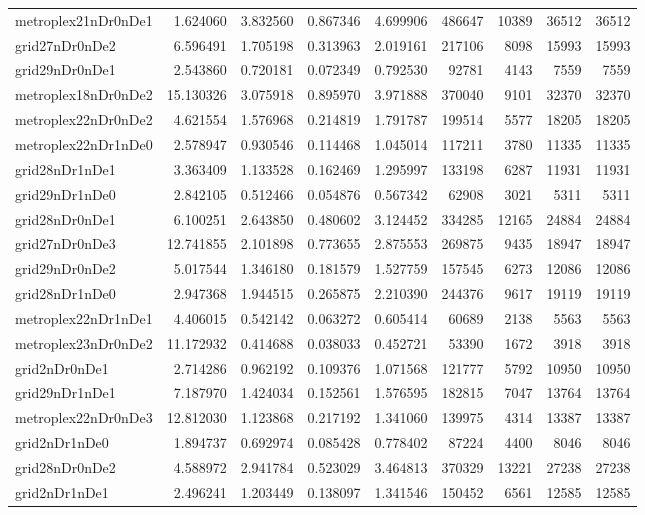 \begin{longtable}{|l|r|r|r|r|r|r|r|r|}
metroplex21nDr0nDe1 & 1.624060 & 3.832560 & 0.867346 & 4.699906 & 486647 & 10389 & 36512 & 36512 \\
grid27nDr0nDe2 & 6.596491 & 1.705198 & 0.313963 & 2.019161 & 217106 & 8098 & 15993 & 15993 \\
grid29nDr0nDe1 & 2.543860 & 0.720181 & 0.072349 & 0.792530 & 92781 & 4143 & 7559 & 7559 \\
metroplex18nDr0nDe2 & 15.130326 & 3.075918 & 0.895970 & 3.971888 & 370040 & 9101 & 32370 & 32370 \\
metroplex22nDr0nDe2 & 4.621554 & 1.576968 & 0.214819 & 1.791787 & 199514 & 5577 & 18205 & 18205 \\
metroplex22nDr1nDe0 & 2.578947 & 0.930546 & 0.114468 & 1.045014 & 117211 & 3780 & 11335 & 11335 \\
grid28nDr1nDe1 & 3.363409 & 1.133528 & 0.162469 & 1.295997 & 133198 & 6287 & 11931 & 11931 \\
grid29nDr1nDe0 & 2.842105 & 0.512466 & 0.054876 & 0.567342 & 62908 & 3021 & 5311 & 5311 \\
grid28nDr0nDe1 & 6.100251 & 2.643850 & 0.480602 & 3.124452 & 334285 & 12165 & 24884 & 24884 \\
grid27nDr0nDe3 & 12.741855 & 2.101898 & 0.773655 & 2.875553 & 269875 & 9435 & 18947 & 18947 \\
grid29nDr0nDe2 & 5.017544 & 1.346180 & 0.181579 & 1.527759 & 157545 & 6273 & 12086 & 12086 \\
grid28nDr1nDe0 & 2.947368 & 1.944515 & 0.265875 & 2.210390 & 244376 & 9617 & 19119 & 19119 \\
metroplex22nDr1nDe1 & 4.406015 & 0.542142 & 0.063272 & 0.605414 & 60689 & 2138 & 5563 & 5563 \\
metroplex23nDr0nDe2 & 11.172932 & 0.414688 & 0.038033 & 0.452721 & 53390 & 1672 & 3918 & 3918 \\
grid2nDr0nDe1 & 2.714286 & 0.962192 & 0.109376 & 1.071568 & 121777 & 5792 & 10950 & 10950 \\
grid29nDr1nDe1 & 7.187970 & 1.424034 & 0.152561 & 1.576595 & 182815 & 7047 & 13764 & 13764 \\
metroplex22nDr0nDe3 & 12.812030 & 1.123868 & 0.217192 & 1.341060 & 139975 & 4314 & 13387 & 13387 \\
grid2nDr1nDe0 & 1.894737 & 0.692974 & 0.085428 & 0.778402 & 87224 & 4400 & 8046 & 8046 \\
grid28nDr0nDe2 & 4.588972 & 2.941784 & 0.523029 & 3.464813 & 370329 & 13221 & 27238 & 27238 \\
grid2nDr1nDe1 & 2.496241 & 1.203449 & 0.138097 & 1.341546 & 150452 & 6561 & 12585 & 12585 \\

\end{longtable}
